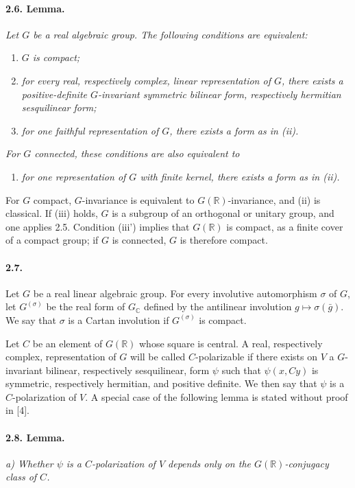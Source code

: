 \documentclass[10pt]{article}
\newcommand{\C}{\mathbb{C}}
\newcommand{\R}{\mathbb{R}}
\begin{document}
\paragraph{2.6. Lemma.} \emph{Let $G$ be a real algebraic group. The following conditions are equivalent:}
\begin{enumerate}[label=(\roman*)]
\item \emph{$G$ is compact;}
\item \emph{for every real, respectively complex, linear representation of $G$, there exists a positive-definite $G$-invariant symmetric bilinear form, respectively hermitian sesquilinear form;}
\item \emph{for one faithful representation of $G$, there exists a form as in (ii).}
\end{enumerate}
\emph{For $G$ connected, these conditions are also equivalent to}
\begin{enumerate}[label=(iii\textquotesingle)]
\item \emph{for one representation of $G$ with finite kernel, there exists a form as in (ii).}
\end{enumerate}

For $G$ compact, $G$-invariance is equivalent to $G(\R)$-invariance, and (ii) is classical. If (iii) holds, $G$ is a subgroup of an orthogonal or unitary group, and one applies 2.5. Condition (iii') implies that $G(\R)$ is compact, as a finite cover of a compact group; if $G$ is connected, $G$ is therefore compact.

\paragraph{2.7.} Let $G$ be a real linear algebraic group. For every involutive automorphism $\sigma$ of $G$, let $G^{(\sigma)}$ be the real form of $G_\C$ defined by the antilinear involution $g\mapsto\sigma(\bar g)$. We say that $\sigma$ is a Cartan involution if $G^{(\sigma)}$ is compact.

Let $C$ be an element of $G(\R)$ whose square is central. A real, respectively complex, representation of $G$ will be called $C$-polarizable if there exists on $V$ a $G$-invariant bilinear, respectively sesquilinear, form $\psi$ such that $\psi(x,Cy)$ is symmetric, respectively hermitian, and positive definite. We then say that $\psi$ is a $C$-polarization of $V$. A special case of the following lemma is stated without proof in [4].

\paragraph{2.8. Lemma.} \emph{a) Whether $\psi$ is a $C$-polarization of $V$ depends only on the $G(\R)$-conjugacy class of $C$.}
\end{document}
